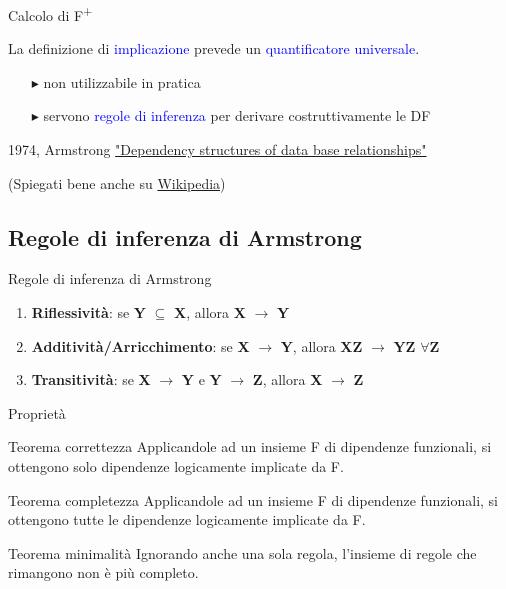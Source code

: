 \documentclass{beamer}
\begin{document}
\begin{frame}{Calcolo di F\textsuperscript{+}}

    La definizione di \textcolor{blue}{implicazione} prevede un \textcolor{blue}{quantificatore universale}.
    \begin{itemize}
        \item[$\blacktriangleright$] non utilizzabile in pratica
        \item[$\blacktriangleright$] servono \textcolor{blue}{regole di inferenza} per derivare costruttivamente le DF
    \end{itemize}
    \vfill
    1974, Armstrong \href{https://web.archive.org/web/20180126091352if_/https://ipfs.io/ipfs/QmWYWTGUZyTm2iRFTZY2pTr2x1vWkDiJr2CBp2PGVpSVSv}{"Dependency structures of data base relationships"}\par
    (Spiegati bene anche su \href{https://it.wikipedia.org/wiki/Assiomi_di_Armstrong}{Wikipedia})
    
    \vfill
\end{frame}

\subsection{Regole di inferenza di Armstrong}
\begin{frame}{Regole di inferenza di Armstrong}
    \begin{enumerate}
        \item \textbf{Riflessività}: se \textbf{Y} $\subseteq$ \textbf{X}, allora \textbf{X} $\rightarrow$ \textbf{Y}
        \item \textbf{Additività/Arricchimento}: se \textbf{X} $\rightarrow$ \textbf{Y}, allora \textbf{XZ} $\rightarrow$ \textbf{YZ} $\forall$\textbf{Z}
        \item \textbf{Transitività}: se \textbf{X} $\rightarrow$ \textbf{Y} e \textbf{Y} $\rightarrow$ \textbf{Z}, allora \textbf{X} $\rightarrow$ \textbf{Z}
    \end{enumerate}
\end{frame}

\begin{frame}{Proprietà}
    \begin{block}{Teorema correttezza}
    Applicandole ad un insieme F di dipendenze funzionali, si ottengono solo dipendenze logicamente implicate da F.
    \end{block}
    
    \begin{block}{Teorema completezza}
    Applicandole ad un insieme F di dipendenze funzionali, si ottengono tutte le dipendenze logicamente implicate da F.
    \end{block}
    
    \begin{block}{Teorema minimalità}
    Ignorando anche una sola regola, l’insieme di regole che rimangono non è più completo.
    \end{block}
\end{frame}
\end{document}
